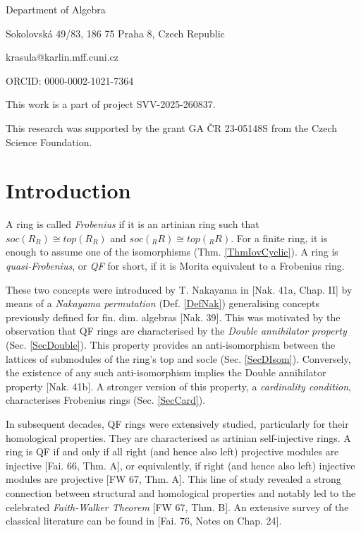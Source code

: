 \documentclass[11pt]{article}
\theoremstyle{plain}
\theoremstyle{remark}
\theoremstyle{plain}
\begin{document}
Department of Algebra

Sokolovská 49/83, 186 75 Praha 8, Czech Republic

krasula@karlin.mff.cuni.cz

ORCID: 0000-0002-1021-7364

\smallskip 

\noindent This work is a part of project SVV-2025-260837.

\noindent This research was supported by the grant GA ČR 23-05148S from the Czech
Science Foundation.


\section{Introduction}

A ring is called \textit{Frobenius} if it is an artinian ring such that $soc(R_R)\cong top(R_R)$ and $soc(_RR)\cong top(_RR)$. For a finite ring, it is enough to assume one of the isomorphisms (Thm. \ref{ThmIovCyclic}). A ring is \textit{quasi-Frobenius}, or \textit{QF} for short, if it is Morita equivalent to a Frobenius ring. 

These two concepts were introduced by T. Nakayama in [Nak. 41a, Chap. II] by means of a \textit{Nakayama permutation} (Def. \ref{DefNak}) generalising concepts previously defined for fin. dim. algebras [Nak. 39]. This was motivated by the observation that QF rings are characterised by the  \textit{Double annihilator property} (Sec. \ref{SecDouble}). This property provides an anti-isomorphism between the lattices of submodules of the ring's top and socle (Sec. \ref{SecDIsom}). Conversely, the existence of any such anti-isomorphism implies the Double annihilator property [Nak. 41b]. A stronger version of this property, a \textit{cardinality condition}, characterises Frobenius rings (Sec. \ref{SecCard}).

In subsequent decades, QF rings were extensively studied, particularly for their homological properties. They are characterised as artinian self-injective rings. A ring is QF if and only if all right (and hence also left) projective modules are injective [Fai. 66, Thm. A], or equivalently, if right (and hence also left) injective modules are projective [FW 67, Thm. A]. This line of study revealed a strong connection between structural and homological properties and notably led to the celebrated \textit{Faith-Walker Theorem} [FW 67, Thm. B]. An extensive survey of the classical literature can be found in [Fai. 76, Notes on Chap. 24].
\end{document}
